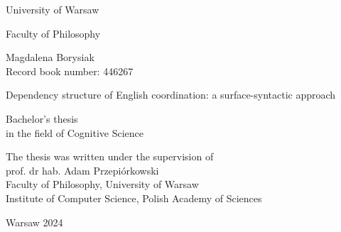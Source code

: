 \begin{titlepage}
	\begin{center}
		\vspace*{1.5cm}
		
		{\huge University of Warsaw}
		
		\vspace{0.1cm}
		{\Large Faculty of Philosophy}
		
		\vspace{3.5cm}
		
		{\Large Magdalena Borysiak} \\ Record book number: 446267
		
		\vspace{2cm}
		
		{\huge Dependency structure of English coordination: a surface-syntactic approach}
		
		
		\vspace{3cm}
		
		{\large Bachelor's thesis \\ in the field of Cognitive Science}
	\end{center}
	
	\vspace{2.5cm}
	
	\begin{flushright}
		The thesis was written under the supervision of \\
		prof. dr hab. Adam Przepiórkowski \\
		Faculty of Philosophy, University of Warsaw \\
		Institute of Computer Science, Polish Academy of Sciences	
	\end{flushright}
	
	\vspace{1.5cm}
	
	\begin{center}
		Warsaw 2024 %
	\end{center}	
\end{titlepage}